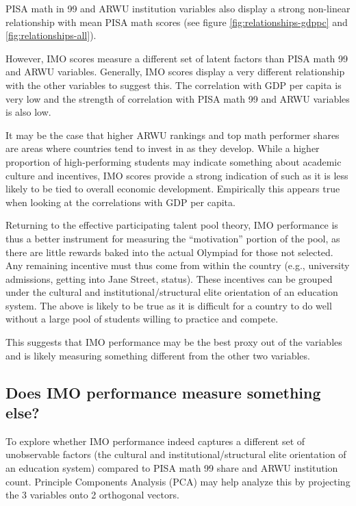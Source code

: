\documentclass[11pt]{article}
\begin{document}
PISA math in 99 and ARWU institution variables also display a strong non-linear relationship with mean PISA math scores (see figure \ref{fig:relationships-gdppc} and \ref{fig:relationships-all}).

However, IMO scores measure a different set of latent factors than PISA math 99 and ARWU variables. Generally, IMO scores display a very different relationship with the other variables to suggest this. The correlation with GDP per capita is very low and the strength of correlation with PISA math 99 and ARWU variables is also low.

It may be the case that higher ARWU rankings and top math performer shares are areas where countries tend to invest in as they develop. While a higher proportion of high-performing students may indicate something about academic culture and incentives, IMO scores provide a strong indication of such as it is less likely to be tied to overall economic development. Empirically this appears true when looking at the correlations with GDP per capita.

Returning to the effective participating talent pool theory, IMO performance is thus a better instrument for measuring the “motivation” portion of the pool, as there are little rewards baked into the actual Olympiad for those not selected. Any remaining incentive must thus come from within the country (e.g., university admissions, getting into Jane Street, status). These incentives can be grouped under the cultural and institutional/structural elite orientation of an education system. The above is likely to be true as it is difficult for a country to do well without a large pool of students willing to practice and compete.

This suggests that IMO performance may be the best proxy out of the variables and is likely measuring something different from the other two variables.

\subsection{Does IMO performance measure something else?}
To explore whether IMO performance indeed captures a different set of unobservable factors (the cultural and institutional/structural elite orientation of an education system) compared to PISA math 99 share and ARWU institution count. Principle Components Analysis (PCA) may help analyze this by projecting the 3 variables onto 2 orthogonal vectors.
\end{document}
